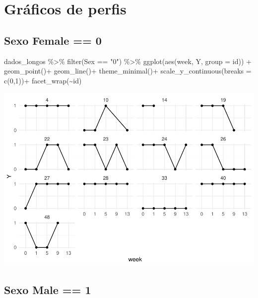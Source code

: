 \documentclass[
]{article}
\newenvironment{Shaded}{\begin{snugshade}}{\end{snugshade}}
\newcommand{\AttributeTok}[1]{\textcolor[rgb]{0.77,0.63,0.00}{#1}}
\newcommand{\DecValTok}[1]{\textcolor[rgb]{0.00,0.00,0.81}{#1}}
\newcommand{\FunctionTok}[1]{\textcolor[rgb]{0.00,0.00,0.00}{#1}}
\newcommand{\NormalTok}[1]{#1}
\newcommand{\SpecialCharTok}[1]{\textcolor[rgb]{0.00,0.00,0.00}{#1}}
\newcommand{\StringTok}[1]{\textcolor[rgb]{0.31,0.60,0.02}{#1}}
\begin{document}
\hypertarget{gruxe1ficos-de-perfis}{%
\section{Gráficos de perfis}\label{gruxe1ficos-de-perfis}}

\hypertarget{sexo-female-0}{%
\subsection{Sexo Female == 0}\label{sexo-female-0}}

\begin{Shaded}
\begin{Highlighting}[]
\NormalTok{dados\_longos }\SpecialCharTok{\%\textgreater{}\%} \FunctionTok{filter}\NormalTok{(Sex }\SpecialCharTok{==} \StringTok{"0"}\NormalTok{) }\SpecialCharTok{\%\textgreater{}\%}
  \FunctionTok{ggplot}\NormalTok{(}\FunctionTok{aes}\NormalTok{(week, Y, }\AttributeTok{group =}\NormalTok{ id)) }\SpecialCharTok{+}
  \FunctionTok{geom\_point}\NormalTok{()}\SpecialCharTok{+}
  \FunctionTok{geom\_line}\NormalTok{()}\SpecialCharTok{+}
  \FunctionTok{theme\_minimal}\NormalTok{()}\SpecialCharTok{+}
  \FunctionTok{scale\_y\_continuous}\NormalTok{(}\AttributeTok{breaks =} \FunctionTok{c}\NormalTok{(}\DecValTok{0}\NormalTok{,}\DecValTok{1}\NormalTok{))}\SpecialCharTok{+}
  \FunctionTok{facet\_wrap}\NormalTok{(}\SpecialCharTok{\textasciitilde{}}\NormalTok{id)}
\end{Highlighting}
\end{Shaded}

\includegraphics{EDA__files/figure-latex/unnamed-chunk-7-1.pdf}

\hypertarget{sexo-male-1}{%
\subsection{Sexo Male == 1}\label{sexo-male-1}}
\end{document}
